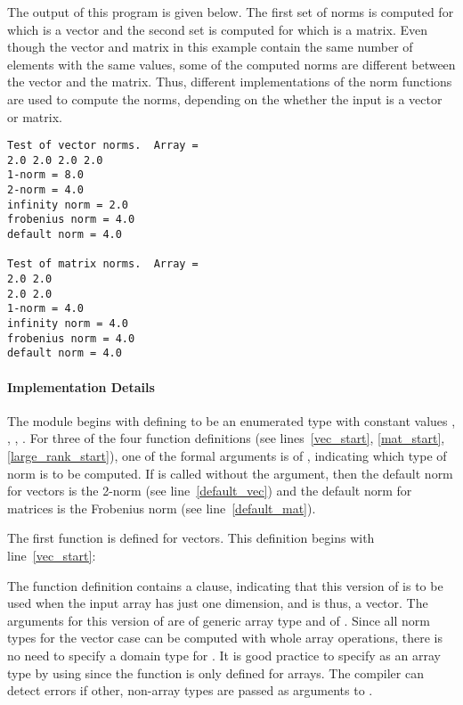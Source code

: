 The output of this program is given below.  The first set
of norms is computed for  which is a vector and the second set 
is computed for  which is
a matrix. Even though the vector and matrix in this example contain
the same number of elements with the same values, some of the computed norms
are different between the vector and the matrix.  Thus, different
implementations of the norm functions are used to compute the norms, 
depending on the whether the input is a vector or matrix.

{\small
\begin{verbatim}
Test of vector norms.  Array = 
2.0 2.0 2.0 2.0
1-norm = 8.0
2-norm = 4.0
infinity norm = 2.0
frobenius norm = 4.0
default norm = 4.0

Test of matrix norms.  Array = 
2.0 2.0
2.0 2.0
1-norm = 4.0
infinity norm = 4.0
frobenius norm = 4.0
default norm = 4.0
\end{verbatim}}

\paragraph{Implementation Details}
The  module begins with defining  to be an
enumerated type  with constant values , , 
, .
For three of the four  function definitions (see lines~\ref{vec_start},
\ref{mat_start}, \ref{large_rank_start}), 
one of the formal arguments is of , indicating which type of norm 
is to be computed.  If  is called without the  argument,
then the default norm for vectors is the 2-norm (see line~\ref{default_vec}) and 
the default norm for matrices is the Frobenius norm (see line~\ref{default_mat}).  

The first  function is defined for vectors.  This definition
begins with line~\ref{vec_start}:
\begin{chapel}
  def norm(x: [], p: normType) where x.rank == 1 {
\end{chapel}
The function definition contains a  clause, indicating that
this version of  is to be used when the input array 
has just one dimension, and is thus, a vector.  The arguments for this version
of  are  of generic array type and  of .  
Since all norm types for the vector case can be computed with whole array 
operations, there 
is no need to specify a domain type for .  It is good practice to
specify  as an array type by using \chpl{: []} since the 
function is only defined for arrays.  The compiler can detect errors if other,
non-array types are passed as arguments to  .


